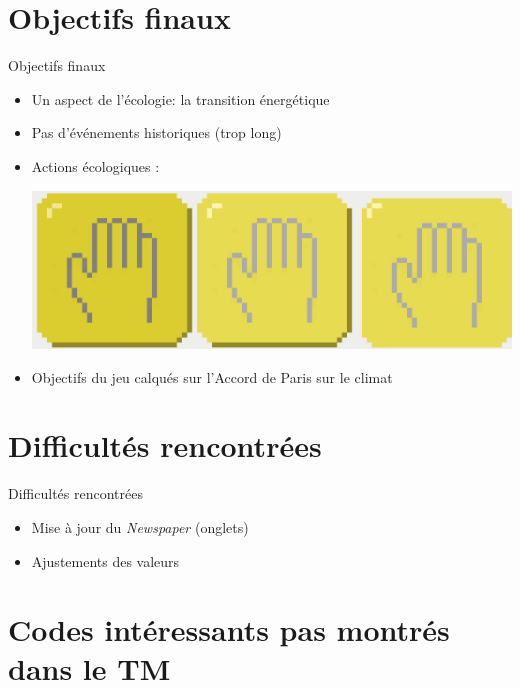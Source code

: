 \documentclass[11pt]{beamer}
\begin{document}
\section{Objectifs finaux}

\begin{frame}{Objectifs finaux}

\begin{itemize}
	\item Un aspect de l'écologie: la transition énergétique
	\item Pas d'événements historiques (trop long)
	\item Actions écologiques : 
	\\ \begin{center} \includegraphics[scale=.08]{../images/ecoActions} \end{center}
	\item Objectifs du jeu calqués sur l'Accord de Paris sur le climat
\end{itemize}

\end{frame}

\section{Difficultés rencontrées}

\begin{frame}{Difficultés rencontrées}

\begin{itemize}
	\item Mise à jour du \textit{Newspaper} (onglets)
	\item Ajustements des valeurs
\end{itemize}

\end{frame}

\section{Codes intéressants pas montrés dans le TM} %
\end{document}
